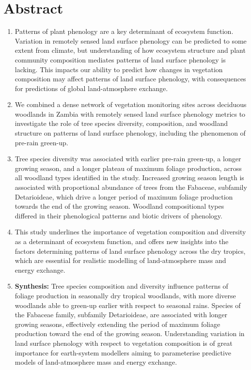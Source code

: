 \documentclass[11pt,a4paper]{article}
\begin{document}
\section*{Abstract}

\begin{enumerate}
	\item{Patterns of plant phenology are a key determinant of ecosystem function. Variation in remotely sensed land surface phenology can be predicted to some extent from climate, but understanding of how ecosystem structure and plant community composition mediates patterns of land surface phenology is lacking. This impacts our ability to predict how changes in vegetation composition may affect patterns of land surface phenology, with consequences for predictions of global land-atmosphere exchange.}
	\item{We combined a dense network of \nSites{} vegetation monitoring sites across deciduous woodlands in Zambia with remotely sensed land surface phenology metrics to investigate the role of tree species diversity, composition, and woodland structure on patterns of land surface phenology, including the phenomenon of pre-rain green-up.} 
	\item{Tree species diversity was associated with earlier pre-rain green-up, a longer growing season, and a longer plateau of maximum foliage production, across all woodland types identified in the study. Increased growing season length is associated with proportional abundance of trees from the Fabaceae, subfamily Detarioideae, which drive a longer period of maximum foliage production towards the end of the growing season. Woodland compositional types differed in their phenological patterns and biotic drivers of phenology. }
	\item{This study underlines the importance of vegetation composition and diversity as a determinant of ecosystem function, and offers new insights into the factors determining patterns of land surface phenology across the dry tropics, which are essential for realistic modelling of land-atmosphere mass and energy exchange.}
	\item{\textbf{Synthesis:} Tree species composition and diversity influence patterns of foliage production in seasonally dry tropical woodlands, with more diverse woodlands able to green-up earlier with respect to seasonal rains. Species of the Fabaceae family, subfamily Detarioideae, are associated with longer growing seasons, effectively extending the period of maximum foliage production toward the end of the growing season. Understanding variation in land surface phenology with respect to vegetation composition is of great importance for earth-system modellers aiming to parameterise predictive models of land-atmosphere mass and energy exchange.}
\end{enumerate}
\end{document}
